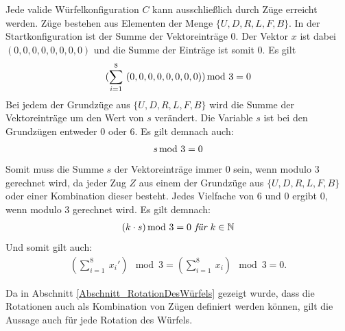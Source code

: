 \documentclass[12pt,a4paper, usenames, dvipsnames]{article}
\theoremstyle{mystyle}
\theoremstyle{definition}
\newcommand{\Gtwo}{\ensuremath{G_{2\times 2\times 2}}}
\begin{document}
Jede valide Würfelkonfiguration $C$ kann ausschließlich durch Züge erreicht werden. Züge bestehen aus Elementen der Menge $\{U, D, R, L, F, B\}$. In der Startkonfiguration ist der Summe der Vektoreinträge $0$. Der Vektor $x$ ist dabei $(0,0,0,0,0,0,0,0)$ und die Summe der Einträge ist somit 0. Es gilt 
\begin{align*}
(\sum_{i= 1}^{8} \ (0,0,0,0,0,0,0,0)) \hspace*{-0.5em} \mod 3 = 0
\end{align*}
Bei jedem der Grundzüge aus $\{U, D, R, L, F, B\}$ wird die Summe der Vektoreinträge um den Wert von $s$ verändert. Die Variable $s$ ist bei den Grundzügen entweder 0 oder 6. Es gilt demnach auch:
\begin{align*}
s \hspace*{-0.5em} \mod 3 = 0
\end{align*}
Somit muss die Summe $s$ der Vektoreinträge immer 0 sein, wenn modulo 3 gerechnet wird, da jeder Zug $Z$ aus einem der Grundzüge aus $\{U, D, R, L, F, B\}$ oder einer Kombination dieser besteht. Jedes Vielfache von 6 und 0 ergibt 0, wenn modulo 3 gerechnet wird. Es gilt demnach:
\begin{align*}
(k \cdot s) \hspace*{-0.5em} \mod 3 = 0 \textit{ für } k \in \mathbb{N}
\end{align*}
Und somit gilt auch:
\begin{align*}
(\sum_{i= 1}^{8} \ x_i') \mod 3 = (\sum_{i= 1}^{8} \  x_i) \mod 3 = 0.
\end{align*}

Da in Abschnitt \ref{Abschnitt_RotationDesWürfels} gezeigt wurde, dass die Rotationen auch als Kombination von Zügen definiert werden können, gilt die Aussage auch für jede Rotation des Würfels.


%
%
%
%
%
%
%
%
%
%
%
%
%
%
%
%
%
%
%
%
\newpage
\end{document}
